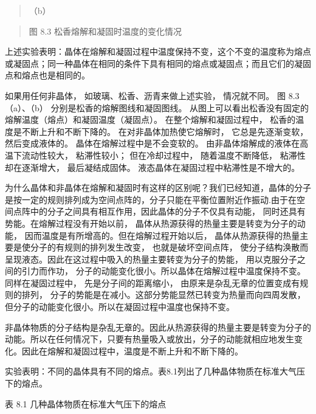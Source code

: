 \begin{quote}
（b）
\end{quote}

\begin{quote}
图 8.3 松香熔解和凝固时温度的变化情况
\end{quote}

上述实验表明：晶体在熔解和凝固过程中温度保持不变，这个不变的温度称为熔点或凝固点；同一种晶体在相同的条件下具有相同的熔点或凝固点；而且它们的凝固点和熔点也是相同的。

如果用任何非晶体， 如玻璃、松香、沥青来做上述实验， 情况就不同。 图
8.3（a）、（b） 分别是松香的熔解图线和凝固图线。
从图上可以看出松香没有固定的熔解温度（熔点）和凝固温度（凝固点）。
在整个熔解和凝固过程中， 松香的温度是不断上升和不断下降的。
在对非晶体加热使它熔解时， 它总是先逐渐变软， 然后变成液体的。
晶体在熔解过程中是不会变软的。 由非晶体熔解成的液体在高温下流动性较大，
粘滞性较小； 但在冷却过程中， 随着温度不断降低， 粘滞性却在逐渐增大，
最后凝结成固体。 液态晶体在凝固过程中粘滞性是不增大的。

为什么晶体和非晶体在熔解和凝固时有这样的区别呢？我们已经知道，晶体的分子是按一定的规则排列成为空间点阵的，分子只能在平衡位置附近作振动.由于在空间点阵中的分子之间具有相互作用，因此晶体的分子不仅具有动能，
同时还具有势能。在熔解过程没有开始以前，
晶体从热源获得的热量主要是转变为分子的动能，
因而温度是有所增高的。但在熔解过程开始以后，
晶体从热源获得的热量主要是使分子的有规则的排列发生改变，
也就是破坏空间点阵，
使分子结构涣散而呈现液态。因此在这过程中吸入的热量主要转变为分子的势能，
用以克服分子之间的引力而作功，
分子的动能变化很小。所以晶体在熔解过程中温度保持不变。同样在凝固过程中，
先是分子间的距离缩小， 由原来是杂乱无章的位置变成有规则的排列，
分子的势能是在减小。这部分势能显然已转变为热量而向四周发散，
但分子的动能变化很小。所以在凝固过程中温度也保持不变。

非晶体物质的分子结构是杂乱无章的。因此从热源获得的热量主要是转变为分子的动能。所以在任何情况下，只要有热量吸入或放出，分子的动能就相应地发生变化。因此在熔解和凝固过程中，温度是不断上升和不断下降的。

实验表明：不同的晶体具有不同的熔点。表8.1列出了几种晶体物质在标准大气压下的熔点。

表 8.1 几种晶体物质在标准大气压下的熔点


